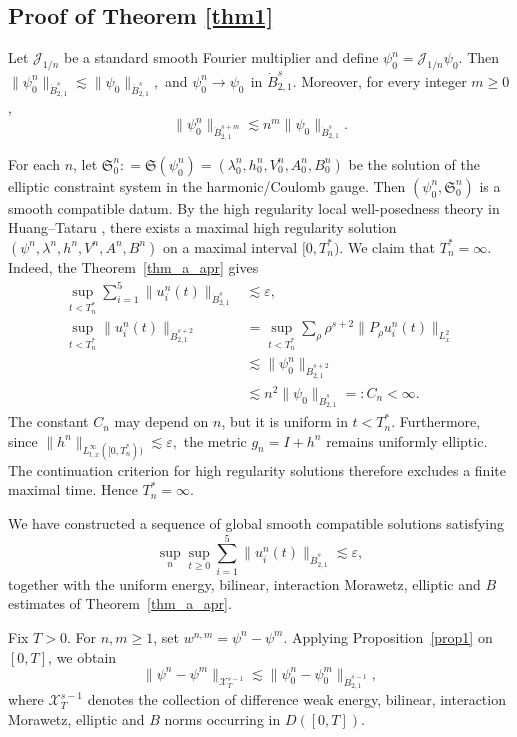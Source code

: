 \documentclass[11pt,letterpaper,reqno]{amsart}
\numberwithin{equation}{section}
\theoremstyle{definition}
\theoremstyle{remark}
\begin{document}
\subsection{Proof of Theorem \ref{thm1}}
Let \(\mathcal J_{1/n}\) be a standard smooth Fourier multiplier and define
\(
\psi_0^n
=
\mathcal J_{1/n}\psi_0.
\)
Then
\(
\|\psi_0^n\|_{\dot B^s_{2,1}}
\lesssim
\|\psi_0\|_{\dot B^s_{2,1}},
\)
and \(
\psi_0^n
\longrightarrow
\psi_0
~~
\text{in }\dot B^s_{2,1}.
\)
Moreover, for every integer \(m\geq0\),
\[
\|\psi_0^n\|_{\dot B^{s+m}_{2,1}}
\lesssim
n^m\|\psi_0\|_{\dot B^s_{2,1}}.
\]


For each \(n\), let
\(
\mathfrak S_0^n:
=
\mathfrak S(\psi_0^n)
=
\left(
\lambda_0^n,h_0^n,V_0^n,A_0^n,B_0^n
\right)
\)
be the solution of the elliptic constraint system in the harmonic/Coulomb
gauge. Then
\(
(\psi_0^n,\mathfrak S_0^n)
\)
is a smooth compatible datum. By the high regularity local well-posedness
theory in Huang--Tataru \cite{HT22}, there exists a maximal high regularity solution
\(
\left(
\psi^n,
\lambda^n,
h^n,
V^n,
A^n,
B^n
\right)
\)
on a maximal interval \(
[0,T_n^*).
\)
We claim that
\(
T_n^*=\infty.
\)
Indeed, the Theorem~\ref{thm_a_apr}  gives
\begin{align}
   \sup_{t<T_n^*}
\sum_{i=1}^5
\|u_i^n(t)\|_{\dot B^s_{2,1}}
& \lesssim
\varepsilon, \nonumber\\
\sup_{t<T_n^*}
\|u_i^n(t)\|_{\dot B^{s+2}_{2,1}}
&=
\sup_{t<T_n^*}
\sum_\rho
\rho^{s+2}
\|P_\rho u_i^n(t)\|_{L_x^2}
\nonumber\\
&\lesssim
\|\psi_0^n\|_{\dot B^{s+2}_{2,1}} \nonumber\\
&\lesssim  
n^2\|\psi_0\|_{\dot B^s_{2,1}}
=:C_n
<\infty.
\label{eq:approximate-high regularity}
\end{align}
The constant \(C_n\) may depend on \(n\), but it is uniform in
\(t<T_n^*\). Furthermore, since
\(
\|h^n\|_{L_{t,x}^\infty([0,T_n^*))}
\lesssim
\varepsilon,
\)
the metric
\(
g_n=I+h^n
\)
remains uniformly elliptic. The continuation criterion for high regularity
solutions therefore excludes a finite maximal time. Hence
\(
T_n^*=\infty.
\)

We have constructed a sequence of global smooth compatible solutions
satisfying
\[
\sup_n
\sup_{t\geq0}
\sum_{i=1}^5
\|u_i^n(t)\|_{\dot B^s_{2,1}}
\lesssim
\varepsilon,
\]
together with the uniform energy,  bilinear, interaction Morawetz, elliptic and
\(B\) estimates of Theorem~\ref{thm_a_apr}.


Fix \(T>0\). For \(n,m\geq1\), set
\(
w^{n,m}
=
\psi^n-\psi^m.
\)
Applying Proposition~\ref{prop1} on \([0,T]\), we
obtain
\[
\|\psi^n-\psi^m\|_{\mathcal X_T^{s-1}}
\lesssim
\|\psi_0^n-\psi_0^m\|_{\dot B^{s-1}_{2,1}},
\]
where \(\mathcal X_T^{s-1}\) denotes the collection of difference weak energy,
bilinear, interaction Morawetz,   elliptic and \(B\) norms occurring in
\(D([0,T])\).
\end{document}
